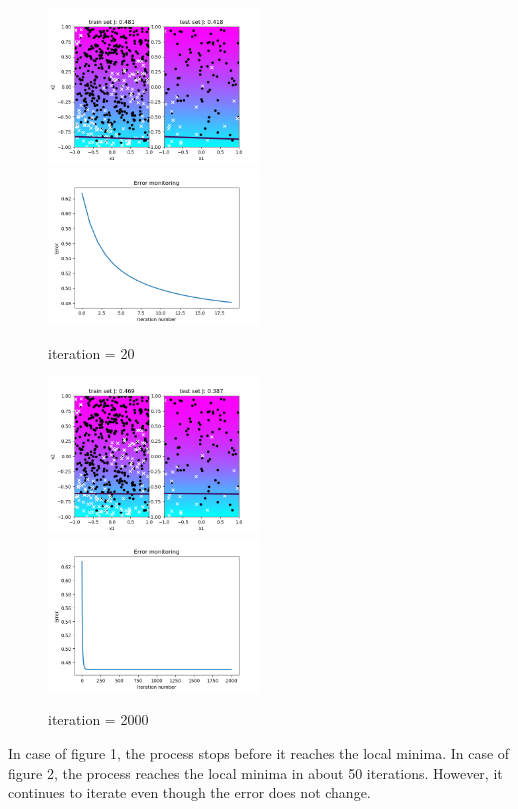 \documentclass[a4paper]{article}
\begin{document}
\begin{figure}[h]
	\includegraphics[width=0.5\textwidth]{logreg_deg1_iter20.png}
	\includegraphics[width=0.5\textwidth]{logreg_deg1_iter20_error.png}
	\caption{iteration = 20}
\end{figure}
\clearpage
\begin{figure}[h]
	\includegraphics[width=0.5\textwidth]{logreg_deg1_iter2000.png}
	\includegraphics[width=0.5\textwidth]{logreg_deg1_iter2000_error.png}
	\caption{iteration = 2000}
\end{figure}

In case of figure 1, the process stops before it reaches the local minima. In case of figure 2, the process reaches the local minima in about 50 iterations. However, it continues to iterate even though the error does not change.  
\end{document}
